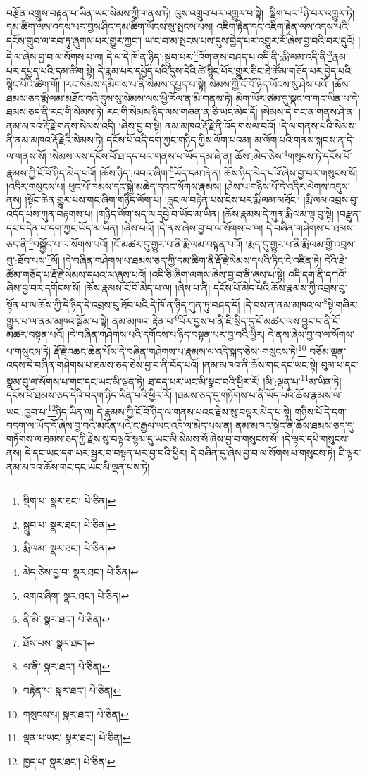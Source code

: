 བརྩོན་འགྲུས་བརྟན་པ་ཡིན་ཡང་སེམས་ཀྱི་གནས་ཏེ། ལུས་འགྲུབ་པར་འགྱུར་བ་སྟེ། :སྡིག་པར་\footnote{སྡིག་པ་  སྣར་ཐང་།  པེ་ཅིན། }ཉེ་བར་འགྱུར་ཏེ། དམ་ཚིག་ལས་འདས་པར་བྱས་ཤིང་དམ་ཚིག་ཡོངས་སུ་སྤངས་པས། འཇིག་རྟེན་དང་འཇིག་རྟེན་ལས་འདས་པའི་དངོས་གྲུབ་ལ་རབ་ཏུ་ཞུགས་པར་གྱུར་ཀྱང་། ཡ་ང་བ་མ་སྤངས་པས་དུས་བྱེད་པར་འགྱུར་རོ་ཞེས་བྱ་བའི་བར་དུའོ། །དེ་ལ་ཞེས་བྱ་བ་ལ་སོགས་པ་ལ། དེ་ལ་དེ་ཁོ་ན་ཉིད་:སྒྲུབ་པར་\footnote{སྒྲུབ་པ་  སྣར་ཐང་།  པེ་ཅིན། }འོག་ནས་བཤད་པ་འདི་ནི་:རྨི་ལམ་འདི་ནི་\footnote{རྨི་ལམ་  སྣར་ཐང་།  པེ་ཅིན། }རྣམ་པར་དཔྱད་པའི་དམ་ཚིག་སྟེ། དེ་རྣམ་པར་དཔྱོད་པའི་དུས་དེའི་ཚེ་སྙིང་པོར་གྱུར་ཅིང་ཐེ་ཚོམ་གཅོད་པར་བྱེད་པའི་སྙིང་པོའི་ཚིག་གོ། །རང་སེམས་དམིགས་པ་ནི་སེམས་དཔྱད་པ་སྟེ། སེམས་ཀྱི་ངོ་བོ་ཉིད་ཡོངས་སུ་ཤེས་པའོ། །ཆོས་ཐམས་ཅད་རྨི་ལམ་མཐོང་བའི་དུས་སུ་སེམས་ལས་ཕྱི་རོལ་ན་མི་གནས་ཏེ། མིག་ཡོར་ཙམ་དུ་སྣང་བ་གང་ཡིན་པ་དེ་ཐམས་ཅད་ནི་རང་གི་སེམས་ཏེ། རང་གི་སེམས་ཉིད་ལས་གཞན་ན་ཅི་ཡང་མེད་དོ། །སེམས་དེ་གང་ན་གནས་ཤེ་ན། །ནམ་མཁའ་རྡོ་རྗེ་གནས་སེམས་འདི། །ཞེས་བྱ་བ་སྟེ། ནམ་མཁའ་རྡོ་རྗེ་ནི་འོད་གསལ་བའོ། །དེ་ལ་གནས་པའི་སེམས་ནི་ནམ་མཁའ་རྡོ་རྗེའི་སེམས་ཏེ། དངོས་པོ་འདི་དག་ཀྱང་གཉིད་ཀྱིས་ལོག་པའམ། མ་ལོག་པའི་གནས་སྐབས་ན་དེ་ལ་གནས་སོ། །སེམས་ལས་དངོས་པོ་ཐ་དད་པར་གནས་པ་ཡོད་དམ་ཞེ་ན། ཆོས་:མེད་ཅེས་\footnote{མེད་ཅེས་བྱ་བ་  སྣར་ཐང་།  པེ་ཅིན། }གསུངས་ཏེ་དངོས་པོ་རྣམས་ཀྱི་ངོ་བོ་ཉིད་མེད་པའོ། །ཆོས་ཉིད་:འབའ་ཞིག་\footnote{འགའ་ཞིག་  སྣར་ཐང་།  པེ་ཅིན། }ཡོད་དམ་ཞེ་ན། ཆོས་ཉིད་མེད་པའོ་ཞེས་བྱ་བར་གསུངས་སོ། །འདིར་གསུངས་པ། ཕུང་པོ་ཁམས་དང་སྐྱེ་མཆེད་དབང་སོགས་རྣམས། །ཤེས་པ་གཉིས་པོ་དེ་འདིར་ལེགས་འདུས་ནས། །སྟོང་ཆེན་གྱུར་པས་གང་ཞིག་གཉིད་ལོག་པ། །རླུང་ལ་བརྟེན་པས་ངེས་པར་རྨི་ལམ་མཐོང་། །རྨི་ལམ་འབྲས་བུ་འདོད་པས་ཀུན་བརྟགས་པ། །གཉིད་ལོག་སད་ལ་དབྱེ་བ་ཡོད་མ་ཡིན། །ཆོས་རྣམས་དེ་ཀུན་རྨི་ལམ་ལྟ་བུ་སྟེ། །བརྫུན་དང་བདེན་པ་དག་ཀྱང་ཡོད་མ་ཡིན། །ཞེས་པའོ། །དེ་ནས་ཞེས་བྱ་བ་ལ་སོགས་པ་ལ། དེ་བཞིན་གཤེགས་པ་ཐམས་ཅད་ནི་\footnote{ནི་མི་  སྣར་ཐང་།  པེ་ཅིན། }བསྐྱོད་པ་ལ་སོགས་པའོ། །ངོ་མཚར་དུ་གྱུར་པ་ནི་རྨི་ལམ་བསྟན་པའོ། །རྨད་དུ་གྱུར་པ་ནི་རྨི་ལམ་གྱི་འབྲས་བུ་:ཐོབ་པས་\footnote{ཐོས་པས་  སྣར་ཐང་། }སོ། །དེ་བཞིན་གཤེགས་པ་ཐམས་ཅད་ཀྱི་དམ་ཚིག་ནི་རྡོ་རྗེ་སེམས་དཔའི་ཏིང་ངེ་འཛིན་ཏེ། དེའི་ཐེ་ཚོམ་གཅོད་པ་རྡོ་རྗེ་སེམས་དཔའ་ལ་ཞུས་པའོ། །འདི་ཅི་ཞིག་ལགས་ཞེས་བྱ་བ་ནི་ཞུས་པ་སྟེ། འདི་དག་ནི་དཀའོ་ཞེས་བྱ་བར་དགོངས་སོ། །ཆོས་རྣམས་ངོ་བོ་མེད་པ་ལ། །ཞེས་པ་ནི། དངོས་པོ་མེད་པའི་ཆོས་རྣམས་ཀྱི་འབྲས་བུ་སྟོན་པ་ལ་ཆོས་ཀྱི་དེ་ཉིད་དེ་འབྲས་བུ་ཐོབ་པའི་དེ་ཁོ་ན་ཉིད་ཀུན་ཏུ་བཤད་དོ། །དེ་བས་ན་ནམ་མཁའ་ལ་\footnote{ལ་ནི་  སྣར་ཐང་།  པེ་ཅིན། }སྟེ་གཞིར་གྱུར་པ་ལ་ནམ་མཁའ་སྒོམ་པ་སྟེ། ནམ་མཁའ་:རྟེན་པ་\footnote{བརྟེན་པ་  སྣར་ཐང་།  པེ་ཅིན། }པོར་བྱས་པ་ནི་ཇི་སྲིད་དུ་ངོ་མཚར་ལས་བྱུང་བ་ནི་ངོ་མཚར་བསྟན་པའོ། །དེ་བཞིན་གཤེགས་པའི་དགོངས་པ་ཉིད་བསྟན་པར་བྱ་བའི་ཕྱིར། དེ་ནས་ཞེས་བྱ་བ་ལ་སོགས་པ་གསུངས་ཏེ། རྡོ་རྗེ་འཆང་ཆེན་པོས་དེ་བཞིན་གཤེགས་པ་རྣམས་ལ་འདི་སྐད་ཅེས་:གསུངས་ཏེ།\footnote{གསུངས་པ།  སྣར་ཐང་།  པེ་ཅིན། } བཅོམ་ལྡན་འདས་དེ་བཞིན་གཤེགས་པ་ཐམས་ཅད་ཅེས་བྱ་བ་ནི་བོད་པའོ། །ནམ་མཁའ་ནི་ཆོས་གང་དང་ཡང་སྟེ། བུམ་པ་དང་སྣམ་བུ་ལ་སོགས་པ་གང་དང་ཡང་མི་ལྡན་ཏེ། ཐ་དད་པར་ཡང་མི་སྣང་བའི་ཕྱིར་རོ། །མི་:ལྡན་པ་\footnote{ལྡན་པ་ཡང་  སྣར་ཐང་།  པེ་ཅིན། }མ་ཡིན་ཏེ། དངོས་པོ་ཐམས་ཅད་དེའི་བདག་ཉིད་ཡིན་པའི་ཕྱིར་རོ། །ཐམས་ཅད་དུ་གཏོགས་པ་ནི་ཡོད་པའི་ཆོས་རྣམས་ལ་ཡང་:ཁྱབ་པ་\footnote{ཁྱད་པ་  སྣར་ཐང་།  པེ་ཅིན། }ཉིད་ཡིན་ལ། དེ་རྣམས་ཀྱི་ངོ་བོ་ཉིད་ལ་གནས་པའང་རྗེས་སུ་བལྟར་མེད་པ་སྟེ། གཉིས་པོ་དེ་དག་བདག་ལ་ཡོད་དོ་ཞེས་བྱ་བའི་མངོན་པའི་ང་རྒྱལ་ཡང་འདི་ལ་མེད་པས་ན། ནམ་མཁའ་སྟེང་ནི་ཆོས་ཐམས་ཅད་དུ་གཏོགས་ལ་ཐམས་ཅད་ཀྱི་རྗེས་སུ་བལྟའོ་སྙམ་དུ་ཡང་མི་སེམས་སོ་ཞེས་བྱ་བ་གསུངས་སོ། །དེ་ལྟར་དཔེ་གསུངས་ནས། དེ་དང་ཡང་དག་པར་སྦྱར་བ་བསྟན་པར་བྱ་བའི་ཕྱིར། དེ་བཞིན་དུ་ཞེས་བྱ་བ་ལ་སོགས་པ་གསུངས་ཏེ། ཇི་ལྟར་ནམ་མཁའ་ཆོས་གང་དང་ཡང་མི་ལྡན་པས་ཏེ། 